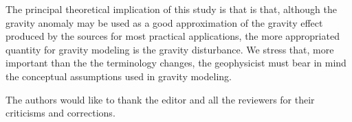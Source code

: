 \documentclass[extra]{gji}
\begin{document}
The principal theoretical implication of this study is that
is that, although the gravity anomaly may be used as a good approximation of
the gravity effect produced by the sources for most practical applications,
the more appropriated quantity for gravity modeling is the
gravity disturbance. We stress that, more important than the 
the terminology changes, the geophysicist must bear in mind the 
conceptual assumptions used in gravity modeling.


\begin{acknowledgments}
The authors would like to thank the editor and all the
reviewers for their criticisms and corrections.
\end{acknowledgments}





\appendix
%
%
%
%
\end{document}
